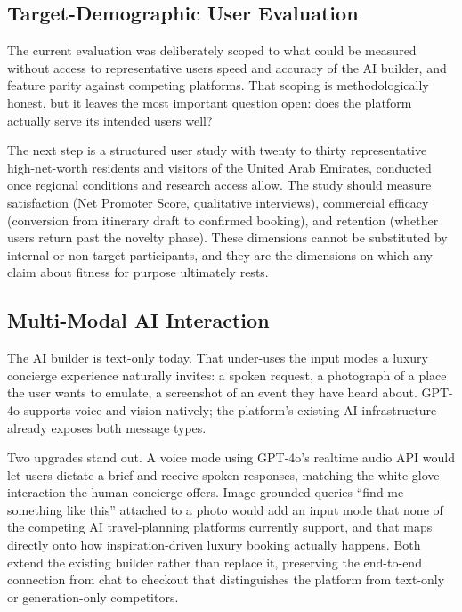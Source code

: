 \subsection{Target-Demographic User Evaluation}

The current evaluation was deliberately scoped to what could be measured without access to representative users speed and accuracy of the AI builder, and feature parity against competing platforms. That scoping is methodologically honest, but it leaves the most important question open: does the platform actually serve its intended users well?

The next step is a structured user study with twenty to thirty representative high-net-worth residents and visitors of the United Arab Emirates, conducted once regional conditions and research access allow. The study should measure satisfaction (Net Promoter Score, qualitative interviews), commercial efficacy (conversion from itinerary draft to confirmed booking), and retention (whether users return past the novelty phase). These dimensions cannot be substituted by internal or non-target participants, and they are the dimensions on which any claim about fitness for purpose ultimately rests.

\subsection{Multi-Modal AI Interaction}

The AI builder is text-only today. That under-uses the input modes a luxury concierge experience naturally invites: a spoken request, a photograph of a place the user wants to emulate, a screenshot of an event they have heard about. GPT-4o supports voice and vision natively; the platform's existing AI infrastructure already exposes both message types.

Two upgrades stand out. A voice mode using GPT-4o's realtime audio API would let users dictate a brief and receive spoken responses, matching the white-glove interaction the human concierge offers. Image-grounded queries ``find me something like this'' attached to a photo would add an input mode that none of the competing AI travel-planning platforms currently support, and that maps directly onto how inspiration-driven luxury booking actually happens. Both extend the existing builder rather than replace it, preserving the end-to-end connection from chat to checkout that distinguishes the platform from text-only or generation-only competitors.